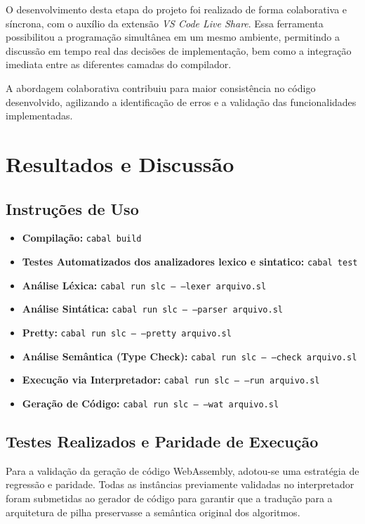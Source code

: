 \documentclass[12pt,a4paper]{article}
\begin{document}
O desenvolvimento desta etapa do projeto foi realizado de forma colaborativa e síncrona, com o auxílio da extensão \textit{VS Code Live Share}. Essa ferramenta possibilitou a programação simultânea em um mesmo ambiente, permitindo a discussão em tempo real das decisões de implementação, bem como a integração imediata entre as diferentes camadas do compilador. 

A abordagem colaborativa contribuiu para maior consistência no código desenvolvido, agilizando a identificação de erros e a validação das funcionalidades implementadas.


\section{Resultados e Discussão}

\subsection{Instruções de Uso}
\begin{itemize}
    \item \textbf{Compilação:} \texttt{cabal build}
    \item \textbf{Testes Automatizados dos analizadores lexico e sintatico:} \texttt{cabal test}
    \item \textbf{Análise Léxica:} \texttt{cabal run slc --- ---lexer arquivo.sl}
    \item \textbf{Análise Sintática:} \texttt{cabal run slc --- ---parser arquivo.sl}
    \item \textbf{Pretty:} \texttt{cabal run slc --- ---pretty arquivo.sl}
    \item \textbf{Análise Semântica (Type Check):} \texttt{cabal run slc --- ---check arquivo.sl}
    \item \textbf{Execução via Interpretador:} \texttt{cabal run slc --- ---run arquivo.sl}
    \item \textbf{Geração de Código:} \texttt{cabal run slc --- ---wat arquivo.sl}
\end{itemize}

\subsection{Testes Realizados e Paridade de Execução}

Para a validação da geração de código WebAssembly, adotou-se uma estratégia de regressão e paridade. Todas as instâncias previamente validadas no interpretador foram submetidas ao gerador de código para garantir que a tradução para a arquitetura de pilha preservasse a semântica original dos algoritmos.
\end{document}
